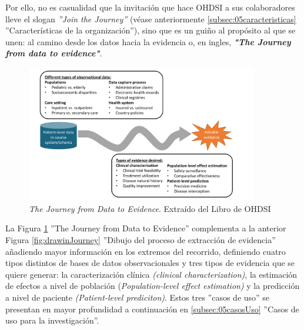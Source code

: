 Por ello, no es casualidad que la invitación que hace OHDSI a sus colaboradores lleve el slogan \textit{''Join the Journey''} (véase anteriormente \ref{subsec:05caracteristicas} ''Características de la organización''), sino que es un guiño al propósito al que se unen: al camino desde los datos hacia la evidencia o, en ingles, \textit{\textbf{"The Journey from data to evidence"}}.  



\begin{figure}[H]
    \centering
    \includegraphics[width=0.90\textwidth]{figures/journeyDataToEvidence.png}
     \caption{\textit{The Journey from Data to Evidence}. Extraído del Libro de OHDSI \parencite{OHDSIbook}}
    \label{fig:journeyDataToEvidence}
\end{figure}

La Figura \ref{fig:journeyDataToEvidence} ''The Journey from Data to Evidence'' complementa a la anterior Figura \ref{fig:drawinJourney} ''Dibujo del proceso de extracción de evidencia'' añadiendo mayor información en los extremos del recorrido, definiendo cuatro tipos distintos de bases de datos observacionales y tres tipos de evidencia que se quiere generar: la caracterización clínica \textit{(clinical characterization)}, la estimación de efectos a nivel de población (\textit{Population-level effect estimation)} y la predicción a nivel de paciente \textit{(Patient-level prediciton)}. Estos tres ''casos de uso'' se presentan en mayor profundidad a continuación en  \ref{subsec:05casosUso} ''Casos de uso para la investigación''.

